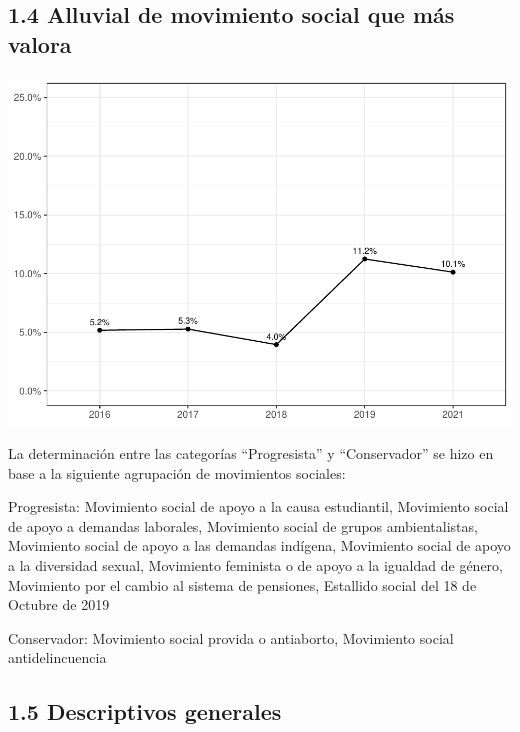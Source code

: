 \documentclass[
  12pt,
  openany]{book}
\begin{document}
\hypertarget{alluvial-de-movimiento-social-que-muxe1s-valora}{%
\subsection{1.4 Alluvial de movimiento social que más valora}\label{alluvial-de-movimiento-social-que-muxe1s-valora}}

\includegraphics{reporte-elsoc_files/figure-latex/unnamed-chunk-13-1.pdf}

La determinación entre las categorías ``Progresista'' y ``Conservador'' se hizo en base a la siguiente agrupación de movimientos sociales:

Progresista: Movimiento social de apoyo a la causa estudiantil, Movimiento social de apoyo a demandas laborales, Movimiento social de grupos ambientalistas, Movimiento social de apoyo a las demandas indígena, Movimiento social de apoyo a la diversidad sexual, Movimiento feminista o de apoyo a la igualdad de género, Movimiento por el cambio al sistema de pensiones, Estallido social del 18 de Octubre de 2019

Conservador: Movimiento social provida o antiaborto, Movimiento social antidelincuencia

\hypertarget{descriptivos-generales}{%
\subsection{1.5 Descriptivos generales}\label{descriptivos-generales}}
\end{document}
